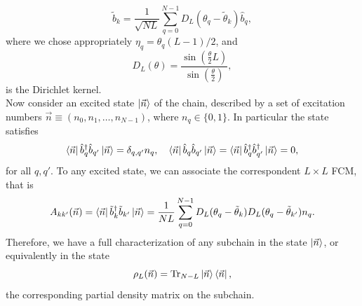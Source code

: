 \begin{equation}
\tilde{b}_k = \frac{1}{\sqrt{NL}}\sum_{q=0}^{N-1} D_{L}(\theta_q-\tilde{\theta}_k) \hat{b}_q,
\label{CH2:From_L_to_N}
\end{equation}
where we chose appropriately  $\eta_q = \theta_q(L-1)/2$, and
\begin{equation}
D_{L}(\theta) = \frac{\sin\left(\frac{\theta}{2}L\right) }{\sin\left(\frac{\theta}{2}\right)},
\end{equation}
is the Dirichlet kernel\cite{bashirov_chapter_2014}.\\
\indent Now consider an excited state $\mathinner{|{\vec{n}}\rangle}$ of the chain, described by a set of excitation numbers $\vec{n}\equiv (n_0,n_1,\ldots, n_{N-1})$, where $n_q\in \{0,1\}$. In particular the state satisfies
\begin{equation}
\mathinner{\langle{\vec{n}}|}\hat{b}^{\dagger}_{q}\hat{b}_{q'}\mathinner{|{\vec{n}}\rangle} = \delta_{q,q'}n_q,\quad \mathinner{\langle{\vec{n}}|}\hat{b}_{q}\hat{b}_{q'}\mathinner{|{\vec{n}}\rangle} = \mathinner{\langle{\vec{n}}|}\hat{b}^{\dagger}_{q}\hat{b}^{\dagger}_{q'}\mathinner{|{\vec{n}}\rangle} = 0,
\end{equation}
for all $q,q'$. To any excited state, we can associate the correspondent $L\times L$ FCM, that is
\begin{equation}
A_{kk'}(\vec{n}) = \mathinner{\langle{\vec{n}}|}\tilde{b}^{\dagger}_k \tilde{b}_{k'}\mathinner{|{\vec{n}}\rangle} = \frac{1}{NL}\sum_{q=0}^{N-1}D_{L}(\theta_q-\tilde{\theta}_k)D_L(\theta_q-\tilde{\theta}_{k'})n_q.
\end{equation}
Therefore, we have a full characterization of any subchain in the state $\mathinner{|{\vec{n}}\rangle}$, or equivalently in the state
\begin{equation}
\rho_L(\vec{n}) = \operatorname{Tr}_{N-L} \mathinner{|{\vec{n}}\rangle}\mathinner{\langle{\vec{n}}|},
\end{equation}
the corresponding partial density matrix on the subchain.

